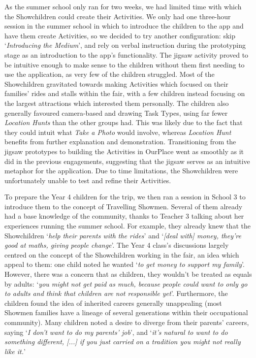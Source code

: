 \documentclass[,hyphens]{sigchi}
\begin{document}
As the summer school only ran for two weeks, we had limited time with which the Showchildren could create their Activities. We only had one three-hour session in the summer school in which to introduce the children to the app and have them create Activities, so we decided to try another configuration: skip `\textit{Introducing the Medium}', and rely on verbal instruction during the prototyping stage as an introduction to the app's functionality. The jigsaw activity proved to be intuitive enough to make sense to the children without them first needing to use the application, as very few of the children struggled. Most of the Showchildren gravitated towards making Activities which focused on their families' rides and stalls within the fair, with a few children instead focusing on the largest attractions which interested them personally. The children also generally favoured camera-based and drawing Task Types, using far fewer \textit{Location Hunts} than the other groups had. This was likely due to the fact that they could intuit what \textit{Take a Photo} would involve, whereas \textit{Location Hunt} benefits from further explanation and demonstration. Transitioning from the jigsaw prototypes to building the Activities in OurPlace went as smoothly as it did in the previous engagements, suggesting that the jigsaw serves as an intuitive metaphor for the application. Due to time limitations, the Showchildren were unfortunately unable to test and refine their Activities.

To prepare the Year 4 children for the trip, we then ran a session in School 3 to introduce them to the concept of Travelling Showmen. Several of them already had a base knowledge of the community, thanks to Teacher 3 talking about her experiences running the summer school. For example, they already knew that the Showchildren `\textit{help their parents with the rides}' and `\textit{[deal with] money, they're good at maths, giving people change}'. The Year 4 class's discussions largely centred on the concept of the Showchildren working in the fair, an idea which appeal to them: one child noted he wanted `\textit{to get money to support my family}'. However, there was a concern that as children, they wouldn't be treated as equals by adults: `\textit{you might not get paid as much, because people could want to only go to adults and think that children are not responsible yet}'. Furthermore, the children found the idea of inherited careers generally unappealing (most Showmen families have a lineage of several generations within their occupational community). Many children noted a desire to diverge from their parents' careers, saying `\textit{I don't want to do my parents' job}', and `\textit{it's natural to want to do something different, [...] if you just carried on a tradition you might not really like it.}'
\end{document}
